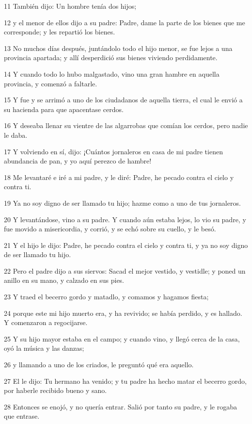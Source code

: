 \par 11 También dijo: Un hombre tenía dos hijos;
\par 12 y el menor de ellos dijo a su padre: Padre, dame la parte de los bienes que me corresponde; y les repartió los bienes.
\par 13 No muchos días después, juntándolo todo el hijo menor, se fue lejos a una provincia apartada; y allí desperdició sus bienes viviendo perdidamente.
\par 14 Y cuando todo lo hubo malgastado, vino una gran hambre en aquella provincia, y comenzó a faltarle.
\par 15 Y fue y se arrimó a uno de los ciudadanos de aquella tierra, el cual le envió a su hacienda para que apacentase cerdos.
\par 16 Y deseaba llenar su vientre de las algarrobas que comían los cerdos, pero nadie le daba.
\par 17 Y volviendo en sí, dijo: ¡Cuántos jornaleros en casa de mi padre tienen abundancia de pan, y yo aquí perezco de hambre!
\par 18 Me levantaré e iré a mi padre, y le diré: Padre, he pecado contra el cielo y contra ti.
\par 19 Ya no soy digno de ser llamado tu hijo; hazme como a uno de tus jornaleros.
\par 20 Y levantándose, vino a su padre. Y cuando aún estaba lejos, lo vio su padre, y fue movido a misericordia, y corrió, y se echó sobre su cuello, y le besó.
\par 21 Y el hijo le dijo: Padre, he pecado contra el cielo y contra ti, y ya no soy digno de ser llamado tu hijo.
\par 22 Pero el padre dijo a sus siervos: Sacad el mejor vestido, y vestidle; y poned un anillo en su mano, y calzado en sus pies.
\par 23 Y traed el becerro gordo y matadlo, y comamos y hagamos fiesta;
\par 24 porque este mi hijo muerto era, y ha revivido; se había perdido, y es hallado. Y comenzaron a regocijarse.
\par 25 Y su hijo mayor estaba en el campo; y cuando vino, y llegó cerca de la casa, oyó la música y las danzas;
\par 26 y llamando a uno de los criados, le preguntó qué era aquello.
\par 27 El le dijo: Tu hermano ha venido; y tu padre ha hecho matar el becerro gordo, por haberle recibido bueno y sano.
\par 28 Entonces se enojó, y no quería entrar. Salió por tanto su padre, y le rogaba que entrase.
